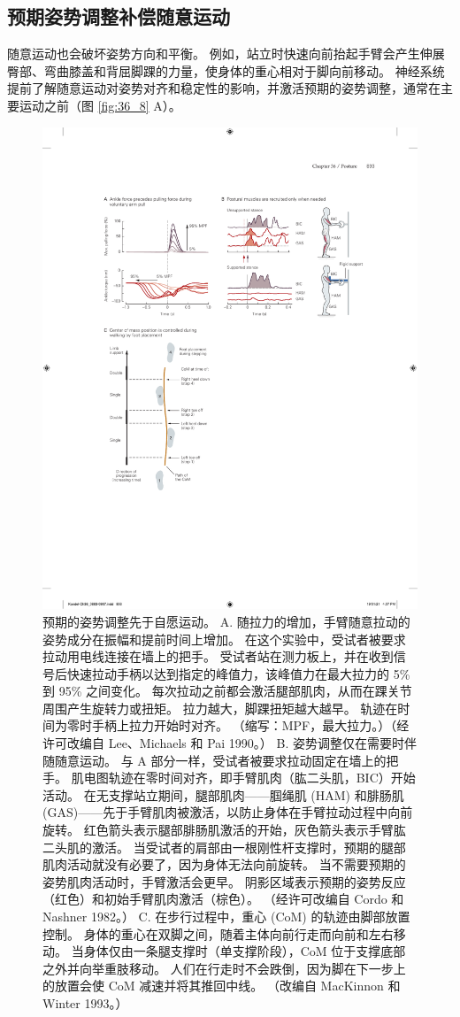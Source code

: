 \subsection{预期姿势调整补偿随意运动}

随意运动也会破坏姿势方向和平衡。
例如，站立时快速向前抬起手臂会产生伸展臀部、弯曲膝盖和背屈脚踝的力量，使身体的重心相对于脚向前移动。 
神经系统提前了解随意运动对姿势对齐和稳定性的影响，并激活预期的姿势调整，通常在主要运动之前（图 \ref{fig:36_8} A）。


\begin{figure}[htbp]
	\centering
	\includegraphics[width=0.85\linewidth]{chap36/fig_36_8}
	\caption{预期的姿势调整先于自愿运动。 A. 随拉力的增加，手臂随意拉动的姿势成分在振幅和提前时间上增加。 在这个实验中，受试者被要求拉动用电线连接在墙上的把手。 受试者站在测力板上，并在收到信号后快速拉动手柄以达到指定的峰值力，该峰值力在最大拉力的 5\% 到 95\% 之间变化。 每次拉动之前都会激活腿部肌肉，从而在踝关节周围产生旋转力或扭矩。 拉力越大，脚踝扭矩越大越早。 轨迹在时间为零时手柄上拉力开始时对齐。 （缩写：MPF，最大拉力。）（经许可改编自 Lee、Michaels 和 Pai 1990。） B. 姿势调整仅在需要时伴随随意运动。 与 A 部分一样，受试者被要求拉动固定在墙上的把手。 肌电图轨迹在零时间对齐，即手臂肌肉（肱二头肌，BIC）开始活动。 在无支撑站立期间，腿部肌肉——腘绳肌 (HAM) 和腓肠肌 (GAS)——先于手臂肌肉被激活，以防止身体在手臂拉动过程中向前旋转。 红色箭头表示腿部腓肠肌激活的开始，灰色箭头表示手臂肱二头肌的激活。 当受试者的肩部由一根刚性杆支撑时，预期的腿部肌肉活动就没有必要了，因为身体无法向前旋转。 当不需要预期的姿势肌肉活动时，手臂激活会更早。 阴影区域表示预期的姿势反应（红色）和初始手臂肌肉激活（棕色）。 （经许可改编自 Cordo 和 Nashner 1982。） C. 在步行过程中，重心 (CoM) 的轨迹由脚部放置控制。 身体的重心在双脚之间，随着主体向前行走而向前和左右移动。 当身体仅由一条腿支撑时（单支撑阶段），CoM 位于支撑底部之外并向举重肢移动。 人们在行走时不会跌倒，因为脚在下一步上的放置会使 CoM 减速并将其推回中线。 （改编自 MacKinnon 和 Winter 1993。）}

\end{figure}

